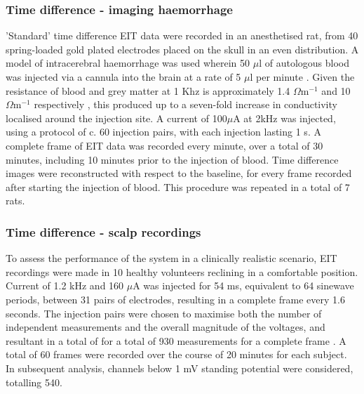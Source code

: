 \subsubsection{Time difference - imaging haemorrhage}
\label{methodsTD}
'Standard' time difference EIT data were recorded in an anesthetised rat, from 40 spring-loaded gold plated electrodes placed on the skull in an even distribution. A model of intracerebral haemorrhage was used wherein 50 $\mu$l of autologous blood was injected via a cannula into the brain at a rate of 5 $\mu$l per minute \cite{Dowrick_2016}. Given the resistance of blood and grey matter at 1 Khz is approximately 1.4 $\Omega {\text{m}}^{-1}$ and 10 $\Omega {\text{m}}^{-1}$ respectively \cite{Gabriel_2009}, this produced up to a seven-fold increase in conductivity localised around the injection site. A current of 100\( \mu \)A at 2kHz was injected, using a protocol of c. 60 injection pairs, with each injection lasting 1 s. A complete frame of EIT data was recorded every minute, over a total of 30 minutes, including 10 minutes prior to the injection of blood.  Time difference images were reconstructed with respect to the baseline, for every frame recorded after starting the injection of blood. This procedure was repeated in a total of 7 rats. 

\subsubsection{Time difference - scalp recordings}

To assess the performance of the system in a clinically realistic scenario, EIT recordings were made in 10 healthy volunteers reclining in a comfortable position. Current of 1.2 kHz and 160 $\mu$A was injected for 54 ms, equivalent to 64 sinewave periods, between 31 pairs of electrodes, resulting in a complete frame every 1.6 seconds. The injection pairs were chosen to maximise both the number of independent measurements and the overall magnitude of the voltages, and resultant in a total of for a total of 930 measurements for a complete frame \cite{Malone2014a}. A total of 60 frames were recorded over the course of 20 minutes for each subject. In subsequent analysis, channels below 1 mV standing potential were considered, totalling 540. 